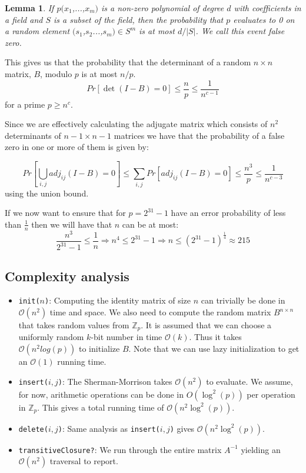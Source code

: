 \documentclass[a4paper,oneside,article,11pt]{memoir}
\newtheorem{lemma}{Lemma}
\begin{document}
\begin{lemma}
\label{lma:zippelSchwarz}
If $p(x_1$,...,$x_m)$ is a non-zero polynomial of degree $d$ with coefficients in a field and $S$ is a subset of the field, then the probability that $p$ evaluates to 0 on a random element $(s_1$,$s_2$...,$s_m) \in S^m$ is at most $d/\rvert S \rvert$. We call this event false zero.
\end{lemma}

This gives us that the probability that the determinant of a random $n \times n$ matrix, $B$, modulo $p$ is at most $n/p$.
$$Pr\left[ \det(I-B)  = 0\right] \leq \frac{n}{p} \leq \frac{1}{n^{c-1}}$$
for a prime $p \geq n^c$.

Since we are effectively calculating the adjugate matrix which consists of $n^2$ determinants of $n-1 \times n-1$ matrices we have that the probability of a false zero in one or more of them is given by:

$$Pr\left[ \bigcup\limits_{i,j} adj_{ij}(I-B) = 0\right] \leq \sum\limits_{i,j}Pr\left[adj_{ij}(I-B) = 0\right] \leq \frac{n^3}{p} \leq \frac{1}{n^{c-3}}$$
using the union bound.

If we now want to ensure that for $p = 2^{31}-1$ have an error probability of less than $\frac{1}{n}$ then we will have that $n$ can be at most:
$$\frac{n^3}{2^{31}-1} \leq \frac{1}{n} \Rightarrow n^4 \leq 2^{31}-1 \Rightarrow n \leq (2^{31}-1)^{\frac{1}{4}} \approx 215$$


\subsection{Complexity analysis}

\begin{itemize}
\item{\texttt{init($n$)}: Computing the identity matrix of size $n$ can trivially be done in $\mathcal{O}(n^2)$ time and space. We also need to compute the random matrix $B^{n \times n}$ that takes random values from $\mathbb{Z}_p$. It is assumed that we can choose a uniformly random $k$-bit number in time $\mathcal{O}(k)$. Thus it takes $\mathcal{O}(n^2 log(p))$ to initialize $B$. Note that we can use lazy initialization to get an $\mathcal{O}(1)$ running time.}
\item{\texttt{insert($i,j$)}: The Sherman-Morrison takes $\mathcal{O}(n^2)$ to evaluate. We assume, for now, arithmetic operations can be done in $O(\log^2(p))$ per operation in $\mathbb{Z}_p$. This gives a total running time of $\mathcal{O}(n^2 \log^2(p))$.}
\item{\texttt{delete($i,j$)}: Same analysis as \texttt{insert($i,j$)} gives $\mathcal{O}(n^2 \log^2(p))$.}
\item{\texttt{transitiveClosure?}: We run through the entire matrix $A^{-1}$ yielding an $\mathcal{O}(n^2)$ traversal to report.}
\end{itemize}
\end{document}
